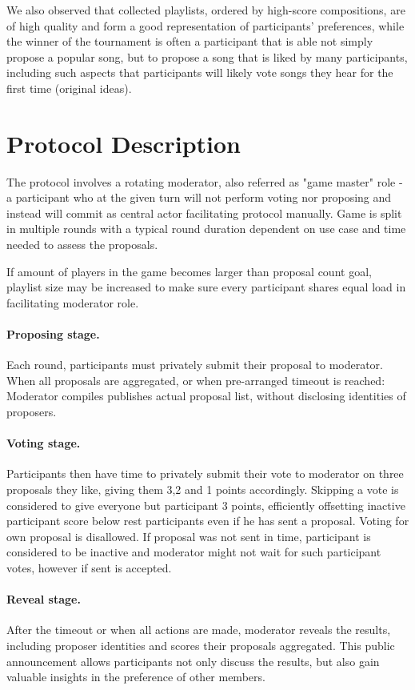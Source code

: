 \documentclass{article}
\begin{document}
\begin{CJK}{UTF8}{gbsn}
\begin{multicols}{2}
        We also observed that collected playlists, ordered by high-score compositions, are of high quality and form a good representation of participants' preferences, while the winner of the tournament is often a participant that is able not simply propose a popular song, but to propose a song that is liked by many participants, including such aspects that participants will likely vote songs they hear for the first time (original ideas).




        \section{Protocol Description}
        The protocol involves a rotating moderator, also referred as "game master" role - a participant who at the given turn will not perform voting nor proposing and instead will commit as central actor facilitating protocol manually. Game is split in multiple rounds with a typical round duration dependent on use case and time needed to assess the proposals.

        If amount of players in the game becomes larger than proposal count goal, playlist size may be increased to make sure every participant shares equal load in facilitating moderator role.
        \paragraph{Proposing stage.}Each round, participants must privately submit their proposal to moderator. When all proposals are aggregated, or when pre-arranged timeout is reached: Moderator compiles publishes actual proposal list, without disclosing identities of proposers.
        \paragraph{Voting stage.}Participants then have time to privately submit their vote to moderator on three proposals they like, giving them 3,2 and 1 points accordingly. Skipping a vote is considered to give everyone but participant 3 points, efficiently offsetting inactive participant score below rest participants even if he has sent a proposal. Voting for own proposal is disallowed.
        If proposal was not sent in time, participant is considered to be inactive and moderator might not wait for such participant votes, however if sent is accepted.
        \paragraph{Reveal stage.}After the timeout or when all actions are made, moderator reveals the results, including proposer identities and scores their proposals aggregated. This public announcement allows participants not only discuss the results, but also gain valuable insights in the preference of other members.

\end{multicols}
\end{CJK}
\end{document}
